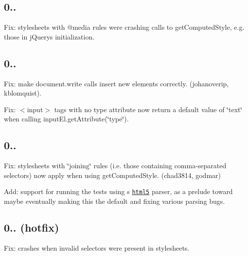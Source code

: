 \subsection*{0..}


\begin{DoxyItemize}
\item Fix\+: stylesheets with {\ttfamily @media} rules were crashing calls to {\ttfamily get\+Computed\+Style}, e.\+g. those in j\+Query\textquotesingle{}s initialization.
\end{DoxyItemize}

\subsection*{0..}


\begin{DoxyItemize}
\item Fix\+: make {\ttfamily document.\+write} calls insert new elements correctly. (johanoverip, kblomquist).
\item Fix\+: {\ttfamily $<$input$>$} tags with no {\ttfamily type} attribute now return a default value of {\ttfamily \char`\"{}text\char`\"{}} when calling {\ttfamily input\+El.\+get\+Attribute(\char`\"{}type\char`\"{})}.
\end{DoxyItemize}

\subsection*{0..}


\begin{DoxyItemize}
\item Fix\+: stylesheets with \char`\"{}joining\char`\"{} rules (i.\+e. those containing comma-\/separated selectors) now apply when using {\ttfamily get\+Computed\+Style}. (chad3814, godmar)
\item Add\+: support for running the tests using \textquotesingle{}s \href{https://npmjs.org/package/html5}{\tt html5} parser, as a prelude toward maybe eventually making this the default and fixing various parsing bugs.
\end{DoxyItemize}

\subsection*{0.. (hotfix)}


\begin{DoxyItemize}
\item Fix\+: crashes when invalid selectors were present in stylesheets.
\end{DoxyItemize}

